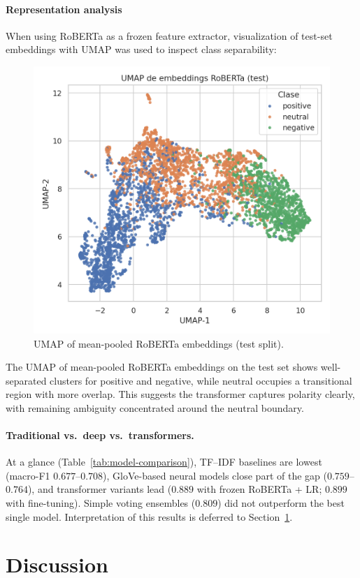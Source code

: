 \documentclass[10pt]{article}
\begin{document}
\paragraph{Representation analysis}
When using RoBERTa as a frozen feature extractor, visualization of test-set embeddings with UMAP was used to inspect class separability:
\begin{figure}[H]
  \centering
  \includegraphics[width=.75\linewidth]{../SCRITPS/artifacts/figures/roberta_fe_test_umap.png}
  \caption{UMAP of mean-pooled RoBERTa embeddings (test split).}
  \label{fig:umap-roberta}
\end{figure}
The UMAP of mean-pooled RoBERTa embeddings on the test set shows well-separated clusters for positive and negative, while neutral occupies a transitional region with more overlap. This suggests the transformer captures polarity clearly, with remaining ambiguity concentrated around the neutral boundary.

\paragraph{Traditional vs.\ deep vs.\ transformers.}
At a glance (Table~\ref{tab:model-comparison}), TF--IDF baselines are lowest (macro-F1 $0.677$--$0.708$), GloVe-based neural models close part of the gap ($0.759$--$0.764$), and transformer variants lead ($0.889$ with frozen RoBERTa + LR; $0.899$ with fine-tuning). Simple voting ensembles ($0.809$) did not outperform the best single model. Interpretation of this results is deferred to Section~\ref{sec:discussion}.
\section{Discussion}\label{sec:discussion}
\end{document}
